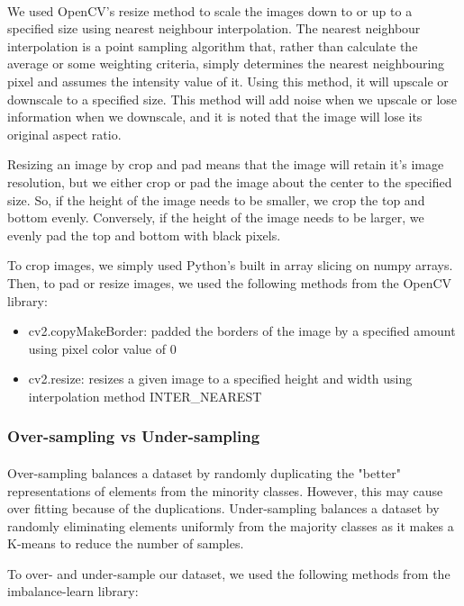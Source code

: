 \documentclass{article}
\begin{document}
\paragraph{}
We used OpenCV's resize method to scale the images down to or up to a specified size using nearest neighbour interpolation. The nearest neighbour interpolation is a point sampling algorithm that, rather than calculate the average or some weighting criteria, simply determines the nearest neighbouring pixel and assumes the intensity value of it. Using this method, it will upscale or downscale to a specified size. This method will add noise when we upscale or lose information when we downscale, and it is noted that the image will lose its original aspect ratio.
\par
Resizing an image by crop and pad means that the image will retain it's image resolution, but we either crop or pad the image about the center to the specified size. So, if the height of the image needs to be smaller, we crop the top and bottom evenly. Conversely, if the height of the image needs to be larger, we evenly pad the top and bottom with black pixels.	

To crop images, we simply used Python's built in array slicing on numpy arrays. Then, to pad or resize images, we used the following methods from the OpenCV library:
\begin{itemize}
	\item cv2.copyMakeBorder: padded the borders of the image by a specified amount using pixel color value of 0
	\item cv2.resize: resizes a given image to a specified height and width using interpolation method INTER\_NEAREST
\end{itemize}

\subsubsection{Over-sampling vs Under-sampling}
\paragraph{}
Over-sampling balances a dataset by randomly duplicating the "better" representations of elements from the minority classes. However, this may cause over fitting because of the duplications. Under-sampling balances a dataset by randomly eliminating elements uniformly from the majority classes as it makes a K-means to reduce the number of samples. 

To over- and under-sample our dataset, we used the following methods from the imbalance-learn library:
\end{document}
